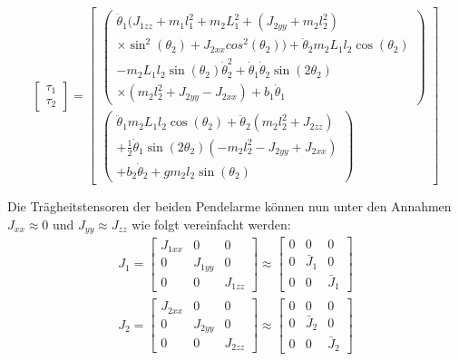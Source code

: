 \begin{equation}
\label{eqn.TauComplex}
\begin{bmatrix}
\tau_1 \\
\tau_2
\end{bmatrix}
=
\begin{bmatrix}
\begin{pmatrix}
\ddot{\theta}_1(J_{1zz}+m_1l^2_1+m_2L^2_1+(J_{2yy}+m_2l^2_2) 						\\
\times \sin^2(\theta_2)+J_{2xx}cos^2(\theta_2))+\ddot{\theta}_2m_2L_1l_2\cos(\theta_2)			\\
-m_2L_1l_2\sin(\theta_2)\dot{\theta}^2_2+\dot{\theta}_1\dot{\theta}_2\sin(2\theta_2)	\\
\times(m_2l^2_2+J_{2yy}-J_{2xx})+b_1\dot{\theta}_1
\end{pmatrix}
\\
\begin{pmatrix}
\ddot{\theta}_1m_2L_1l_2\cos(\theta_2)+\ddot{\theta}_2(m_2l^2_2+J_{2zz})	\\
+\frac{1}{2}\dot{\theta}_1\sin(2\theta_2)(-m_2l^2_2-J_{2yy}+J_{2xx})						\\
+b_2\dot{\theta}_2+gm_2l_2\sin(\theta_2)
\end{pmatrix}
\end{bmatrix}
\end{equation}

Die Trägheitstensoren der beiden Pendelarme können nun unter den Annahmen $J_{xx} \approx 0$ und $J_{yy} \approx J_{zz}$ wie folgt vereinfacht werden: 
\begin{eqnarray}
\label{eqn.Tragheitstensoren}
J_1=
\begin{bmatrix}
J_{1xx} & 0 & 0\\
0 & J_{1yy} & 0\\
0 & 0 & J_{1zz}
\end{bmatrix}
\approx
\begin{bmatrix}
0 & 0 & 0\\
0 & \bar{J}_{1} & 0\\
0 & 0 & \bar{J}_{1}
\end{bmatrix}
\nonumber \\
J_2=
\begin{bmatrix}
J_{2xx} & 0 & 0\\
0 & J_{2yy} & 0\\
0 & 0 & J_{2zz}
\end{bmatrix}
\approx
\begin{bmatrix}
0 & 0 & 0\\
0 & \bar{J}_{2} & 0\\
0 & 0 & \bar{J}_{2}
\end{bmatrix}
\end{eqnarray}

